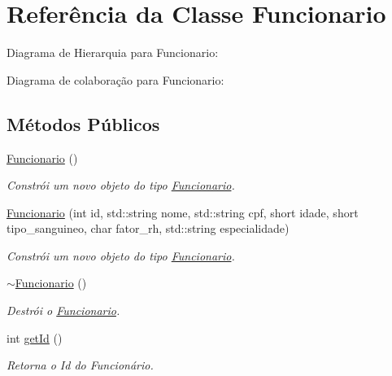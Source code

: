 \hypertarget{classFuncionario}{}\section{Referência da Classe Funcionario}
\label{classFuncionario}


Diagrama de Hierarquia para Funcionario\+:


Diagrama de colaboração para Funcionario\+:
\subsection*{Métodos Públicos}
\begin{DoxyCompactItemize}
\item 
\mbox{\label{classFuncionario_a7cd39b2c6cd2449162481a8c0e7a2429}} 
\hyperlink{classFuncionario_a7cd39b2c6cd2449162481a8c0e7a2429}{Funcionario} ()
\begin{DoxyCompactList}\small\item\em Constrói um novo objeto do tipo \hyperlink{classFuncionario}{Funcionario}. \end{DoxyCompactList}\item 
\hyperlink{classFuncionario_a28e5fd647179d37e3b93e50b7c03401a}{Funcionario} (int id, std\+::string nome, std\+::string cpf, short idade, short tipo\+\_\+sanguineo, char fator\+\_\+rh, std\+::string especialidade)
\begin{DoxyCompactList}\small\item\em Constrói um novo objeto do tipo \hyperlink{classFuncionario}{Funcionario}. \end{DoxyCompactList}\item 
\mbox{\label{classFuncionario_a800273bd909dc88f821a414abebc442c}} 
\hyperlink{classFuncionario_a800273bd909dc88f821a414abebc442c}{$\sim$\+Funcionario} ()
\begin{DoxyCompactList}\small\item\em Destrói o \hyperlink{classFuncionario}{Funcionario}. \end{DoxyCompactList}\item 
int \hyperlink{classFuncionario_a0288286a907e587b7ab75d6c23354a06}{get\+Id} ()
\begin{DoxyCompactList}\small\item\em Retorna o Id do Funcionário. \end{DoxyCompactList}\item 

\end{DoxyCompactItemize}
